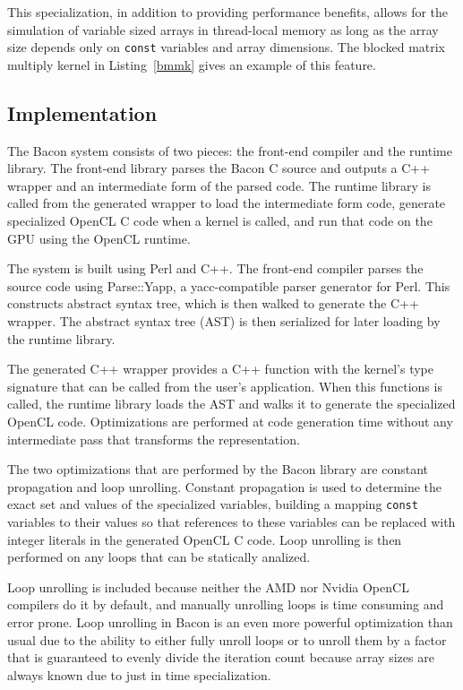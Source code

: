 \documentclass{llncs}
\begin{document}
This specialization, in addition to providing performance benefits,
allows for the simulation of variable sized arrays in thread-local
memory as long as the array size depends only on {\tt const} variables
and array dimensions. The blocked matrix multiply kernel in
Listing~\ref{bmmk} gives an example of this feature.

\subsection{Implementation}

The Bacon system consists of two pieces: the front-end compiler and the
runtime library. The front-end library parses the Bacon C source and
outputs a C++ wrapper and an intermediate form of the parsed code. The
runtime library is called from the generated wrapper to load the
intermediate form code, generate specialized OpenCL C code when a
kernel is called, and run that code on the GPU using the OpenCL
runtime.

The system is built using Perl and C++. The front-end compiler parses
the source code using Parse::Yapp\cite{parse::yapp}, a yacc-compatible
parser generator for Perl. This constructs abstract syntax tree, which
is then walked to generate the C++ wrapper. The abstract syntax tree
(AST) is then serialized for later loading by the runtime library.

The generated C++ wrapper provides a C++ function with the kernel's
type signature that can be called from the user's application. When
this functions is called, the runtime library loads the AST and walks
it to generate the specialized OpenCL code. Optimizations are performed
at code generation time without any intermediate pass that transforms
the representation.

The two optimizations that are performed by the Bacon library are
constant propagation and loop unrolling. Constant propagation is used
to determine the exact set and values of the specialized variables,
building a mapping {\tt const} variables to their values so that
references to these variables can be replaced with integer literals in
the generated OpenCL C code. Loop unrolling is then performed on any
loops that can be statically analized.

Loop unrolling is included because neither the AMD nor Nvidia OpenCL
compilers do it by default, and manually unrolling loops is time
consuming and error prone. Loop unrolling in Bacon is an even more
powerful optimization than usual due to the ability to either fully
unroll loops or to unroll them by a factor that is guaranteed to
evenly divide the iteration count because array sizes are always known
due to just in time specialization.
\end{document}
